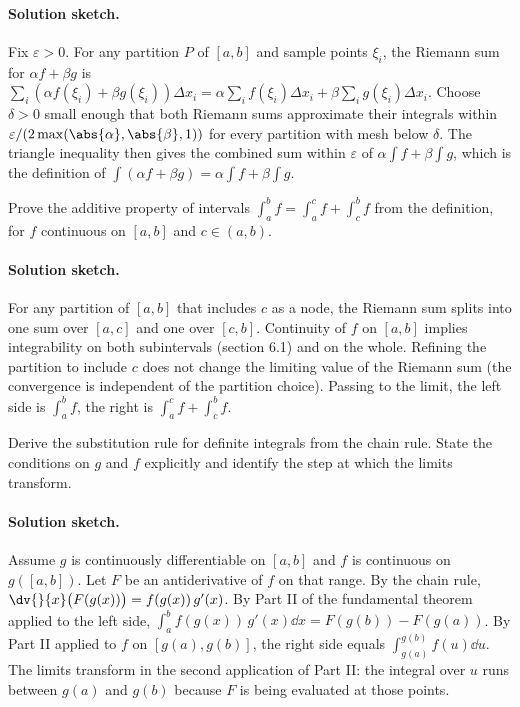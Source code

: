\paragraph{Solution sketch.}
Fix $\varepsilon > 0$. For any partition $P$ of $[a, b]$ and
sample points $\xi_{i}$, the Riemann sum for $\alpha f + \beta g$
is $\sum_{i}(\alpha f(\xi_{i}) + \beta g(\xi_{i})) \Delta x_{i} =
\alpha \sum_{i} f(\xi_{i})\Delta x_{i} + \beta \sum_{i}
g(\xi_{i})\Delta x_{i}$. Choose $\delta > 0$ small enough that
both Riemann sums approximate their integrals within
$\varepsilon / (2 \max(\abs{\alpha}, \abs{\beta}, 1))$ for every
partition with mesh below $\delta$. The triangle inequality then
gives the combined sum within $\varepsilon$ of $\alpha \int f +
\beta \int g$, which is the definition of $\int (\alpha f + \beta
g) = \alpha \int f + \beta \int g$.

\begin{exercise}
Prove the additive property of intervals
$\int_{a}^{b} f = \int_{a}^{c} f + \int_{c}^{b} f$ from the
definition, for $f$ continuous on $[a, b]$ and $c \in (a, b)$.
\end{exercise}

\paragraph{Solution sketch.}
For any partition of $[a, b]$ that includes $c$ as a node, the
Riemann sum splits into one sum over $[a, c]$ and one over
$[c, b]$. Continuity of $f$ on $[a, b]$ implies integrability on
both subintervals (section 6.1) and on the whole. Refining the
partition to include $c$ does not change the limiting value of
the Riemann sum (the convergence is independent of the partition
choice). Passing to the limit, the left side is $\int_{a}^{b}f$,
the right is $\int_{a}^{c}f + \int_{c}^{b}f$.

\begin{exercise}
Derive the substitution rule for definite integrals from the
chain rule. State the conditions on $g$ and $f$ explicitly and
identify the step at which the limits transform.
\end{exercise}

\paragraph{Solution sketch.}
Assume $g$ is continuously differentiable on $[a, b]$ and $f$ is
continuous on $g([a, b])$. Let $F$ be an antiderivative of $f$ on
that range. By the chain rule, $\dv{}{x}\bigl(F(g(x))\bigr) =
f(g(x))\,g'(x)$. By Part II of the fundamental theorem applied
to the left side, $\int_{a}^{b} f(g(x))\,g'(x)\dd x = F(g(b)) -
F(g(a))$. By Part II applied to $f$ on $[g(a), g(b)]$, the right
side equals $\int_{g(a)}^{g(b)} f(u)\dd u$. The limits transform
in the second application of Part II: the integral over $u$ runs
between $g(a)$ and $g(b)$ because $F$ is being evaluated at those
points.

